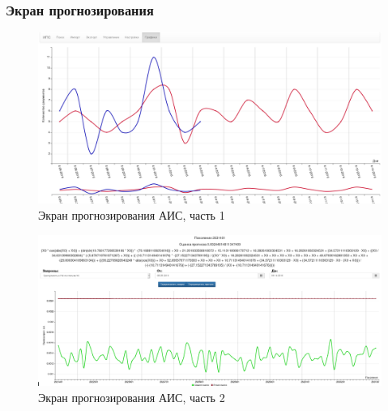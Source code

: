 \clearpage
\subsubsection{Экран прогнозирования} 

\begin{figure}[h!]
\centering
\includegraphics[width=0.9\linewidth]{technology/gui_predict1}
\caption{Экран прогнозирования АИС, часть 1}
\label{figure:guiPredict2}
\end{figure}

\begin{figure}[h!]
\centering
\includegraphics[width=0.9\linewidth]{technology/gui_predict2}
\caption{Экран прогнозирования АИС, часть 2}
\label{figure:guiPredict1}
\end{figure}

